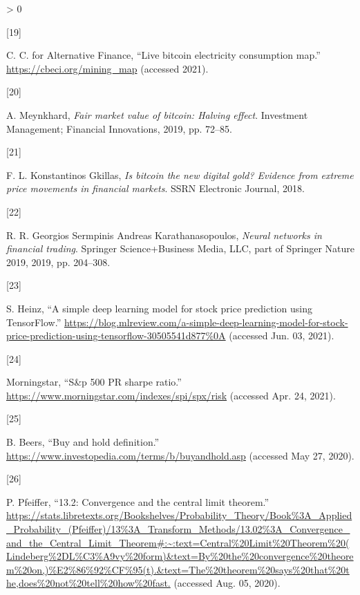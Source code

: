 \documentclass[
]{article}
\newlength{\cslhangindent}
\newlength{\csllabelwidth}
\newenvironment{CSLReferences}[2] %
 {%
  \setlength{\parindent}{0pt}
  \ifodd #1 \everypar{\setlength{\hangindent}{\cslhangindent}}\ignorespaces\fi
  \ifnum #2 > 0
  \setlength{\parskip}{#2\baselineskip}
  \fi
 }%
 {}
\newcommand{\CSLLeftMargin}[1]{\parbox[t]{\csllabelwidth}{#1}}
\newcommand{\CSLRightInline}[1]{\parbox[t]{\linewidth - \csllabelwidth}{#1}\break}
\begin{document}
\begin{CSLReferences}{0}{0}
\leavevmode\hypertarget{ref-energy_map}{}%
\CSLLeftMargin{{[}19{]} }
\CSLRightInline{C. C. for Alternative Finance, {``Live bitcoin
electricity consumption map.''} \url{https://cbeci.org/mining_map}
(accessed 2021).}

\leavevmode\hypertarget{ref-bitcoin_halving}{}%
\CSLLeftMargin{{[}20{]} }
\CSLRightInline{A. Meynkhard, \emph{Fair market value of bitcoin:
Halving effect}. Investment Management; Financial Innovations, 2019, pp.
72--85.}

\leavevmode\hypertarget{ref-digital_gold}{}%
\CSLLeftMargin{{[}21{]} }
\CSLRightInline{F. L. Konstantinos Gkillas, \emph{Is bitcoin the new
digital gold? Evidence from extreme price movements in financial
markets}. SSRN Electronic Journal, 2018.}

\leavevmode\hypertarget{ref-nn_trading}{}%
\CSLLeftMargin{{[}22{]} }
\CSLRightInline{R. R. Georgios Sermpinis Andreas Karathanasopoulos,
\emph{Neural networks in financial trading}. Springer Science+Business
Media, LLC, part of Springer Nature 2019, 2019, pp. 204--308.}

\leavevmode\hypertarget{ref-heinz}{}%
\CSLLeftMargin{{[}23{]} }
\CSLRightInline{S. Heinz, {``A simple deep learning model for stock
price prediction using TensorFlow.''}
\url{https://blog.mlreview.com/a-simple-deep-learning-model-for-stock-price-prediction-using-tensorflow-30505541d877\%0A}
(accessed Jun. 03, 2021).}

\leavevmode\hypertarget{ref-Sux5cux26P500_sharpe}{}%
\CSLLeftMargin{{[}24{]} }
\CSLRightInline{Morningstar, {``S\&p 500 PR sharpe ratio.''}
\url{https://www.morningstar.com/indexes/spi/spx/risk} (accessed Apr.
24, 2021).}

\leavevmode\hypertarget{ref-bnh}{}%
\CSLLeftMargin{{[}25{]} }
\CSLRightInline{B. Beers, {``Buy and hold definition.''}
\url{https://www.investopedia.com/terms/b/buyandhold.asp} (accessed May
27, 2020).}

\leavevmode\hypertarget{ref-central_limit_theorem}{}%
\CSLLeftMargin{{[}26{]} }
\CSLRightInline{P. Pfeiffer, {``13.2: Convergence and the central limit
theorem.''}
\url{https://stats.libretexts.org/Bookshelves/Probability_Theory/Book\%3A_Applied_Probability_(Pfeiffer)/13\%3A_Transform_Methods/13.02\%3A_Convergence_and_the_Central_Limit_Theorem\#:~:text=Central\%20Limit\%20Theorem\%20(Lindeberg\%2DL\%C3\%A9vy\%20form)\&text=By\%20the\%20convergence\%20theorem\%20on,)\%E2\%86\%92\%CF\%95(t).\&text=The\%20theorem\%20says\%20that\%20the,does\%20not\%20tell\%20how\%20fast.}
(accessed Aug. 05, 2020).}


\end{CSLReferences}
\end{document}
